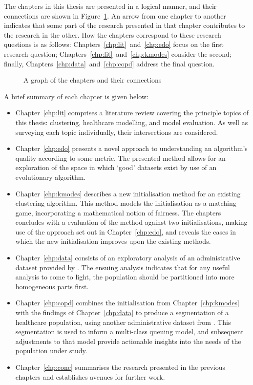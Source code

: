 The chapters in this thesis are presented in a logical manner, and their
connections are shown in Figure~\ref{fig:chapters}. An arrow from one chapter to
another indicates that some part of the research presented in that chapter
contributes to the research in the other. How the chapters correspond to these
research questions is as follows: Chapters~\ref{chp:lit}~and~\ref{chp:edo} focus
on the first research question; Chapters~\ref{chp:lit}~and~\ref{chp:kmodes}
consider the second; finally, Chapters~\ref{chp:data}~and~\ref{chp:copd} address
the final question.

\begin{figure}
    \centering%
    \resizebox{\imgwidth}{!}{%
    
    }
    \caption{A graph of the chapters and their connections}\label{fig:chapters}
\end{figure}

A brief summary of each chapter is given below:

\begin{itemize}
    \item Chapter~\ref{chp:lit} comprises a literature review covering the
        principle topics of this thesis: clustering, healthcare modelling, and
        model evaluation. As well as surveying each topic individually, their
        intersections are considered.
    \item Chapter~\ref{chp:edo} presents a novel approach to understanding an
        algorithm's quality according to some metric. The presented method
        allows for an exploration of the space in which `good' datasets exist
        by use of an evolutionary algorithm.
    \item Chapter~\ref{chp:kmodes} describes a new initialisation method for an
        existing clustering algorithm. This method models the initialisation as
        a matching game, incorporating a mathematical notion of fairness. The
        chapters concludes with a evaluation of the method against two
        initialisations, making use of the approach set out in
        Chapter~\ref{chp:edo}, and reveals the cases in which the new
        initialisation improves upon the existing methods.
    \item Chapter~\ref{chp:data} consists of an exploratory analysis of an
        administrative dataset provided by \ctmuhb. The ensuing analysis
        indicates that for any useful analysis to come to light, the population
        should be partitioned into more homogeneous parts first.
    \item Chapter~\ref{chp:copd} combines the initialisation from
        Chapter~\ref{chp:kmodes} with the findings of Chapter~\ref{chp:data} to
        produce a segmentation of a healthcare population, using another
        administrative dataset from \ctmuhb. This segmentation is used to inform
        a multi-class queuing model, and subsequent adjustments to that model
        provide actionable insights into the needs of the population under
        study.
    \item Chapter~\ref{chp:conc} summarises the research presented in the
        previous chapters and establishes avenues for further work.
\end{itemize}

